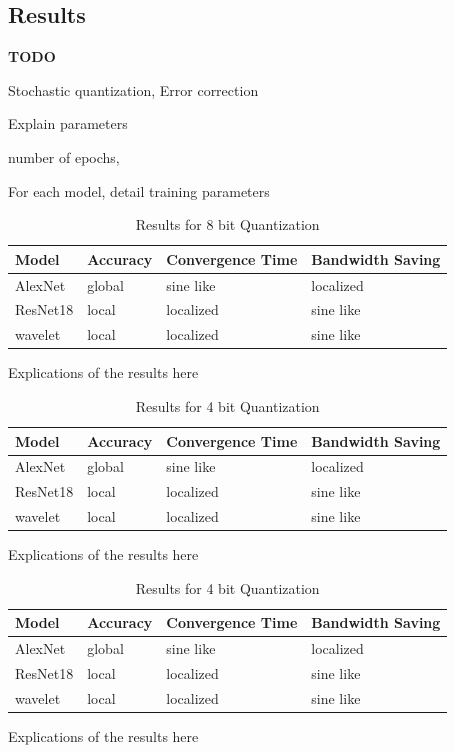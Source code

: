 \documentclass[10pt,conference,compsocconf]{IEEEtran}
\begin{document}
\subsection{Results}

\textbf{TODO}

Stochastic quantization,
Error correction

Explain parameters

number of epochs, 

For each model, detail training parameters


\begin{table}[htbp]
  \centering
  \begin{tabular}[c]{|l||l|l|l|}
    \hline
    Model&Accuracy&Convergence Time&Bandwidth Saving\\
    \hline
    AlexNet&global&sine like&localized\\
    ResNet18&local&localized&sine like\\
    wavelet&local&localized&sine like\\
    \hline
  \end{tabular}

  \singlespacing
	\caption{Results for 8 bit Quantization}
\end{table}

Explications of the results here

\begin{table}[htbp]
  \centering
  \begin{tabular}[c]{|l||l|l|l|}
    \hline
    Model&Accuracy&Convergence Time&Bandwidth Saving\\
    \hline
    AlexNet&global&sine like&localized\\
    ResNet18&local&localized&sine like\\
    wavelet&local&localized&sine like\\
    \hline
  \end{tabular}

  \singlespacing
	\caption{Results for 4 bit Quantization}
\end{table}

Explications of the results here

\begin{table}[htbp]
  \centering
  \begin{tabular}[c]{|l||l|l|l|}
    \hline
    Model&Accuracy&Convergence Time&Bandwidth Saving\\
    \hline
    AlexNet&global&sine like&localized\\
    ResNet18&local&localized&sine like\\
    wavelet&local&localized&sine like\\
    \hline
  \end{tabular}

  \singlespacing
	\caption{Results for 4 bit Quantization}
\end{table}
Explications of the results here
\end{document}
